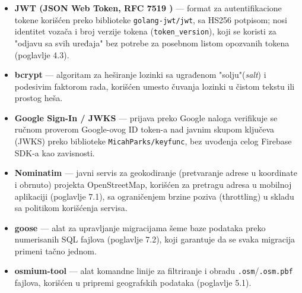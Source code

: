\begin{itemize}
\item \textbf{JWT (JSON Web Token, RFC 7519 \cite{jwt})} — format za autentifikacione tokene korišćen preko biblioteke \texttt{golang-jwt/jwt}, sa HS256 potpisom; nosi identitet vozača i broj verzije tokena (\texttt{token\_version}), koji se koristi za "odjavu sa svih uređaja" bez potrebe za posebnom listom opozvanih tokena (poglavlje 4.3).
\item \textbf{bcrypt} — algoritam za heširanje lozinki sa ugrađenom "solju"(\emph{salt}) i podesivim faktorom rada, korišćen umesto čuvanja lozinki u čistom tekstu ili prostog heša.
\item \textbf{Google Sign-In / JWKS} — prijava preko Google naloga verifikuje se ručnom proverom Google-ovog ID token-a nad javnim skupom ključeva (JWKS) preko biblioteke \texttt{MicahParks/keyfunc}, bez uvođenja celog Firebase SDK-a kao zavisnosti.
\item \textbf{Nominatim \cite{nominatim}} — javni servis za geokodiranje (pretvaranje adrese u koordinate i obrnuto) projekta OpenStreetMap, korišćen za pretragu adresa u mobilnoj aplikaciji (poglavlje 7.1), sa ograničenjem brzine poziva (throttling) u skladu sa politikom korišćenja servisa.
\item \textbf{goose \cite{goose}} — alat za upravljanje migracijama šeme baze podataka preko numerisanih SQL fajlova (poglavlje 7.2), koji garantuje da se svaka migracija primeni tačno jednom.
\item \textbf{osmium-tool} — alat komandne linije za filtriranje i obradu \texttt{.osm}/\texttt{.osm.pbf} fajlova, korišćen u pripremi geografskih podataka (poglavlje 5.1).
\end{itemize}

\clearpage
